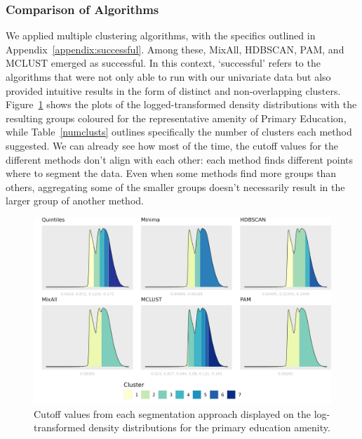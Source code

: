 \documentclass[11pt, a4paper]{article}
\begin{document}
\subsubsection{Comparison of Algorithms}


We applied multiple clustering algorithms, with the specifics outlined in Appendix~\ref{appendix:successful}. Among these, MixAll, HDBSCAN, PAM, and MCLUST emerged as successful. In this context, `successful' refers to the algorithms that were not only able to run with our univariate data but also provided intuitive results in the form of distinct and non-overlapping clusters. Figure~\ref{prieduccutoffs} shows the plots of the logged-transformed density distributions with the resulting groups coloured for the representative amenity of Primary Education, while Table~\ref{numclusts} outlines specifically the number of clusters each method suggested. We can already see how most of the time, the cutoff values for the different methods don't align with each other: each method finds different points where to segment the data. Even when some methods find more groups than others, aggregating some of the smaller groups doesn’t necessarily result in the larger group of another method.





\begin{figure}[H]
\centering
\includegraphics[width=\textwidth]{./cutoffs/by_amenity/Primary Education_cutoffs.png}
\caption[Primary education cutoffs]{Cutoff values from each segmentation approach displayed on the log-transformed density distributions for the primary education amenity.}\label{prieduccutoffs}
\end{figure}
\end{document}
